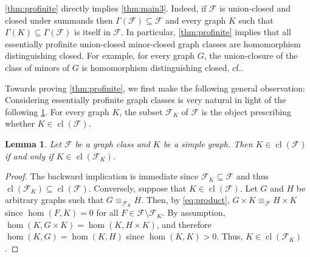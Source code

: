 \documentclass[3p,final]{elsarticle}
\DeclareMathOperator{\spn}{span}
\DeclareMathOperator{\cl}{cl}
\newtheorem{lemma}[theorem]{Lemma}
\begin{document}
	
	\cref{thm:profinite} directly implies \cref{thm:main3}. Indeed, if $\mathcal{F}$ is union-closed and closed under summands then $\Gamma(\mathcal{F}) \subseteq \mathcal{F}$ and every graph $K$ such that $\Gamma(K) \subseteq \Gamma(\mathcal{F})$ is itself in $\mathcal{F}$.
	In particular, \cref{thm:profinite} implies that all essentially profinite union-closed minor-closed graph classes are homomorphism distinguishing closed.
	For example, for every graph $G$, the union-closure of the class of minors of $G$ is homomorphism distinguishing closed, cf.\@ \cite[Question~4]{roberson_oddomorphisms_2022}.
	
	
	Towards proving \cref{thm:profinite}, we first make the following general observation:
	Considering essentially profinite graph classes is very natural in light of the following \cref{lem:reduction}. For every graph $K$, the subset $\mathcal{F}_K$ of $\mathcal{F}$ is the object prescribing whether $K \in \cl(\mathcal{F})$.
	
	\begin{lemma} \label{lem:reduction}
		Let $\mathcal{F}$ be a graph class and $K$ be a simple  graph. 
		Then $K \in \cl(\mathcal{F})$ if and only if $K \in \cl(\mathcal{F}_K)$.
	\end{lemma}
	\begin{proof}%
		The backward implication is immediate since $\mathcal{F}_K \subseteq \mathcal{F}$ and thus $\cl(\mathcal{F}_K) \subseteq \cl(\mathcal{F})$.
		Conversely, suppose that $K \in \cl(\mathcal{F})$. Let $G$ and $H$ be arbitrary graphs such that $G \equiv_{\mathcal{F}_K} H$.
		Then, by \cref{eq:product}, $G \times K \equiv_{\mathcal{F}} H \times K$ since $\hom(F, K) = 0$ for all $F \in \mathcal{F} \setminus \mathcal{F}_K$.
		By assumption, $\hom(K,G \times K) = \hom(K, H \times K)$, and therefore $\hom(K, G) = \hom(K, H)$ since $\hom(K, K) > 0$. Thus, $K \in \cl(\mathcal{F}_K)$.
	\end{proof}
	
\end{document}
